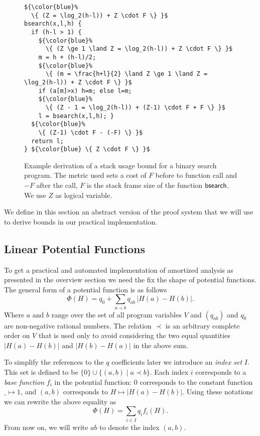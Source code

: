 \documentclass[nocopyrightspace,preprint]{sigplanconf}
\begin{document}
\begin{figure}
\begin{lstlisting}
${\color{blue}%
  \{ (Z = \log_2(h-l)) + Z \cdot F \} }$
bsearch(x,l,h) {
  if (h-l > 1) {
    ${\color{blue}%
      \{ (Z \ge 1 \land Z = \log_2(h-l)) + Z \cdot F \} }$
    m = h + (h-l)/2;
    ${\color{blue}%
      \{ (m = \frac{h+l}{2} \land Z \ge 1 \land Z = \log_2(h-l)) + Z \cdot F \} }$
    if (a[m]>x) h=m; else l=m;
    ${\color{blue}%
      \{ (Z - 1 = \log_2(h-l)) + (Z-1) \cdot F + F \} }$
    l = bsearch(x,l,h); }
  ${\color{blue}%
    \{ (Z-1) \cdot F - (-F) \} }$
  return l;
} ${\color{blue} \{ Z \cdot F \} }$
\end{lstlisting}
\caption{Example derivation of a stack usage bound for a binary
  search program.  The metric used sets a cost of $F$ before
  to function call and $-F$ after the call, $F$ is the stack
  frame size of the function $\mathsf{bsearch}$.  We use $Z$ as
  logical variable.
  }
\label{fig:xmplbs}
\end{figure}

We define in this section an abstract version of the proof system that
we will use to derive bounds in our practical implementation.

\subsection{Linear Potential Functions}

To get a practical and automated implementation of amortized analysis
as presented in the overview section we need the fix the shape of
potential functions.  The general form of a potential function is as follows
$$
\Phi(H) = q_0 + \sum_{a \prec b} q_{ab}\,|H(a) - H(b)|.
$$
Where $a$ and $b$ range over the set of all program variables $V$ and
$(q_{ab})$ and $q_0$ are non-negative rational numbers.  The relation
$\prec$ is an arbitrary complete order on $V$ that is used only to
avoid considering the two equal quantities $|H(a) - H(b)|$ and
$|H(b) - H(a)|$ in the above sum.

To simplify the references to the $q$ coefficients later we introduce
an \emph{index set} $I$.  This set is defined to be $\{0\} \cup
\{(a, b) \mid a \prec b\}$.  Each index $i$ corresponds to a \emph{base
function} $f_i$ in the potential function: $0$ corresponds to the constant
function $\_ \mapsto 1$, and $(a,b)$ corresponds to $H \mapsto
|H(a) - H(b)|$.  Using these notations we can rewrite the above
equality as
$$
\Phi(H) = \sum_{i \in I} q_i f_i(H).
$$
From now on, we will write $ab$ to denote the index $(a,b)$.
\end{document}
